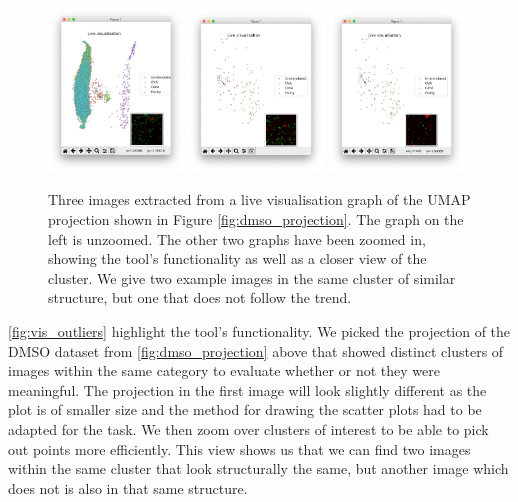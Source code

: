 \begin{figure}[h]
    \centering
    \includegraphics[width=0.32\textwidth]{dissertation/figures/evaluation/right_cluster_big.png}
    \includegraphics[width=0.32\textwidth]{dissertation/figures/evaluation/right_cluster_red_1.png}
    \includegraphics[width=0.32\textwidth]{dissertation/figures/evaluation/right_cluster_red_2.png}
    \caption{Three images extracted from a live visualisation graph of the UMAP projection shown in Figure \ref{fig:dmso_projection}. The graph on the left is unzoomed. The other two graphs have been zoomed in, showing the tool's functionality as well as a closer view of the cluster. We give two example images in the same cluster of similar structure, but one that does not follow the trend.}
    \label{fig:vis_outliers}
\end{figure}

\autoref{fig:vis_outliers} highlight the tool's functionality. We picked the projection of the DMSO dataset from \autoref{fig:dmso_projection} above that showed distinct clusters of images within the same category to evaluate whether or not they were meaningful. The projection in the first image will look slightly different as the plot is of smaller size and the method for drawing the scatter plots had to be adapted for the task. We then zoom over clusters of interest to be able to pick out points more efficiently. This view shows us that we can find two images within the same cluster that look structurally the same, but another image which does not is also in that same structure. 

